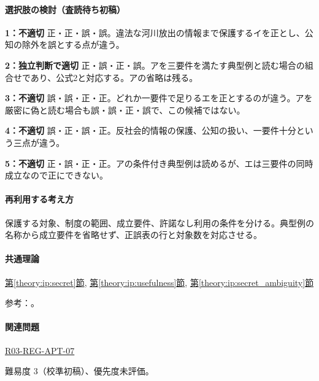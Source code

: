 \paragraph{選択肢の検討（査読待ち初稿）}\mbox{}\par

\noindent\textbf{1：不適切} 正・正・誤・誤。違法な河川放出の情報まで保護するイを正とし、公知の除外を誤とする点が違う。\par

\noindent\textbf{2：独立判断で適切} 正・誤・正・誤。アを三要件を満たす典型例と読む場合の組合せであり、公式2と対応する。アの省略は残る。\par

\noindent\textbf{3：不適切} 誤・誤・正・正。どれか一要件で足りるエを正とするのが違う。アを厳密に偽と読む場合も誤・誤・正・誤で、この候補ではない。\par

\noindent\textbf{4：不適切} 誤・正・誤・正。反社会的情報の保護、公知の扱い、一要件十分という三点が違う。\par

\noindent\textbf{5：不適切} 正・誤・正・正。アの条件付き典型例は読めるが、エは三要件の同時成立なので正にできない。\par

\paragraph{再利用する考え方} 保護する対象、制度の範囲、成立要件、許諾なし利用の条件を分ける。典型例の名称から成立要件を省略せず、正誤表の行と対象数を対応させる。

\paragraph{共通理論} \hyperref[theory:ip:secret]{第\ref*{theory:ip:secret}節}, \hyperref[theory:ip:usefulness]{第\ref*{theory:ip:usefulness}節}, \hyperref[theory:ip:secret_ambiguity]{第\ref*{theory:ip:secret_ambiguity}節}

\par 参考：\cite{ip_unfair_statute,ip_secret_handbook2017}。

\paragraph{関連問題} \hyperref[q:r03-reg-apt-07]{R03-REG-APT-07}

\par 難易度 3（校準初稿）、優先度未評価。

